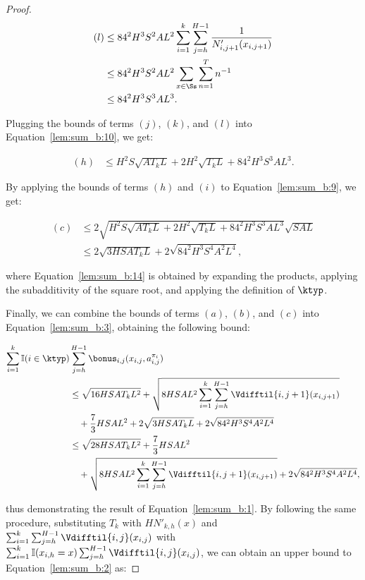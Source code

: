 \begin{proof}
\begin{align*}
    (l) &\le 84^2 H^3 S^2 A L^2 \sum_{i=1}^k \sum_{j=h}^{H-1} \frac{1}{N'_{i,j+1}(x_{i,j+1})} \\
    &\le 84^2 H^3 S^2 A L^2 \sum_{x \in \Ss} \sum_{n=1}^T n^{-1} \\
    &\le 84^2 H^3 S^3 A L^3.
\end{align*}

Plugging the bounds of terms $(j)$, $(k)$, and $(l)$ into Equation~\eqref{lem:sum_b:10}, we get:

\begin{align*}
    (h) &\le H^2 S \sqrt{A T_k L} + 2 H^2 \sqrt{T_k L} + 84^2 H^3 S^3 A L^3.
\end{align*}

By applying the bounds of terms $(h)$ and $(i)$ to Equation~\eqref{lem:sum_b:9}, we get:

\begin{align}
    (c) &\le 2 \sqrt{H^2 S \sqrt{A T_k L} + 2 H^2 \sqrt{T_k L} + 84^2 H^3 S^3 A L^3} \sqrt{SAL} \nonumber \\
    &\le 2 \sqrt{3 H S A T_k L} + 2 \sqrt{84^2 H^3 S^4 A^2 L^4}, \label{lem:sum_b:14}
\end{align}

where Equation~\eqref{lem:sum_b:14} is obtained by expanding the products, applying the subadditivity of the square root, and applying the definition of $\ktyp$.

Finally, we can combine the bounds of terms $(a)$, $(b)$, and $(c)$ into Equation~\eqref{lem:sum_b:3}, obtaining the following bound:

\begin{align*}
    \sum_{i=1}^k \mathbb{I}(i \in \ktyp) &\sum_{j=h}^{H-1} \bonus_{i,j}(x_{i,j}, a_{i,j}^{\pi_i}) \\
    &\le \sqrt{16 H S A T_k L^2} + \sqrt{8 HSAL^2 \sum_{i=1}^k \sum_{j=h}^{H-1} \Vdifftil{i,j+1}(x_{i,j+1})} \\
    &\quad + \frac{7}{3} HSAL^2 + 2 \sqrt{3 H S A T_k L} + 2 \sqrt{84^2 H^3 S^4 A^2 L^4} \\
    &\le \sqrt{28 HSAT_kL^2} + \frac{7}{3} HSAL^2 \\
    &\quad + \sqrt{8 HSAL^2 \sum_{i=1}^k \sum_{j=h}^{H-1} \Vdifftil{i,j+1}(x_{i,j+1})} + 2 \sqrt{84^2 H^3 S^4 A^2 L^4},
\end{align*}

thus demonstrating the result of Equation~\eqref{lem:sum_b:1}. By following the same procedure, substituting $T_k$ with $H N'_{k,h}(x)$ and $\sum_{i=1}^k \sum_{j=h}^{H-1} \Vdifftil{i,j}(x_{i,j})$ with $\sum_{i=1}^k \mathbb{I}{(x_{i,h}=x)} \sum_{j=h}^{H-1} \Vdifftil{i,j}(x_{i,j})$, we can obtain an upper bound to Equation~\eqref{lem:sum_b:2} as:


\end{proof}
